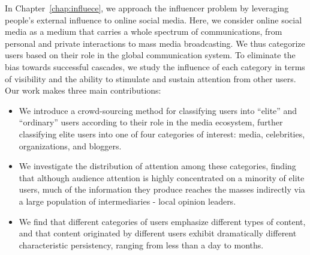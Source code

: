 \documentclass[phd,tocprelim]{cornell}
\begin{document}
In Chapter~\ref{chap:influece}, we approach the influencer problem by leveraging people's external influence to online social media. Here, we consider online social media as a medium that carries a whole spectrum of communications, from personal and private interactions to mass media broadcasting. We thus categorize users based on their role in the global communication system. To eliminate the bias towards successful cascades, we study the influence of each category in terms of visibility and the ability to stimulate and sustain attention from other users. Our work makes three main contributions:
\begin{itemize}
\item We introduce a crowd-sourcing method for classifying users into ``elite''
and ``ordinary'' users according to their role in the media ecosystem, further
classifying elite users into one of four categories of interest: media,
celebrities, organizations, and bloggers.
\item We investigate the distribution of attention among these categories, finding that although audience attention is
highly concentrated on a minority of elite users, much of the information they produce reaches the masses indirectly via a large population of intermediaries - local opinion leaders.
\item We find that different categories of users emphasize different types of content, and that content originated by different users exhibit dramatically different characteristic persistency, ranging from less than a day to months.
\end{itemize}







\end{document}
